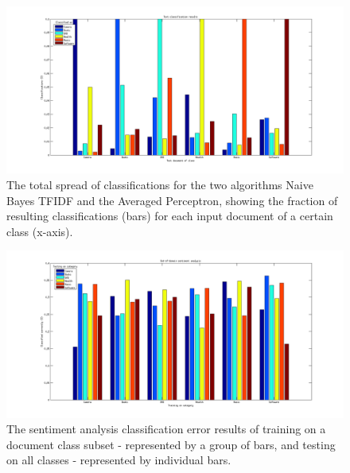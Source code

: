 \begin{figure}
\centering
\includegraphics[scale = 0.47]{../Plottar/text_categorization.png}
\caption{The total spread of classifications for the two algorithms Naive Bayes TFIDF and the Averaged Perceptron, showing the fraction of resulting classifications (bars) for each input document of a certain class (x-axis).}
\end{figure} 

\begin{figure}
\centering
\includegraphics[scale = 0.47]{../Plottar/outofdomain.png}
\caption{The sentiment analysis classification error results of training on a document class subset - represented by a group of bars, and testing on all classes - represented by individual bars.}
\end{figure} 

